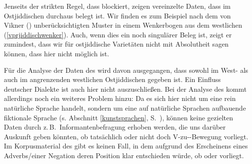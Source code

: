 Jenseits der strikten Regel, dass  \hai{{\VPR}} blockiert, zeigen vereinzelte Daten, dass \hai{{\VPR}} im Ostjiddischen durchaus belegt ist. Wir finden es zum Beispiel nach dem von Vikner (\citeyear{Vikner1995,Vikner2001}) unberücksichtigten Muster  in einem Wenkerbogen aus dem westlichen \hai{{\ZOJ}} (\ref{vprjiddischwenker}). Auch, wenn dies ein noch singulärer Beleg ist, zeigt er zumindest, dass wir für ostjiddische Varietäten nicht mit Absolutheit sagen können, dass \hai{{\VPR}} hier nicht möglich ist. 


 
  Für die Analyse der Daten des \hai{{\LiJi}} wird davon ausgegangen, dass \hai{{\VPR}} sowohl im West- als auch im angrenzenden westlichen Ostjiddischen gegeben ist. Ein Einfluss deutscher Dialekte ist auch hier nicht auszuschließen. Bei der Analyse des \hai{{\LiJi}} kommt allerdings noch ein weiteres Problem hinzu: Da es sich hier nicht um eine rein natürliche Sprache handelt, sondern um eine auf natürliche Sprachen aufbauende fiktionale Sprache (s. Abschnitt \ref{kunstsprachen}, S.\, \pageref{kunstsprachen}), können keine gezielten Daten durch z.\,B.\, Informantenbefragung erhoben werden, die uns darüber Auskunft geben könnten, ob tatsächlich \hai{{\VPR}} oder nicht doch {V}-zu--Bewegung vorliegt. Im Korpusmaterial des \hai{{\LiJi}} gibt es keinen Fall, in dem aufgrund des Erscheinens eines Adverbs/einer Negation deren Position klar entschieden würde, ob \hai{{\VPR}} oder  vorliegt. 
  
